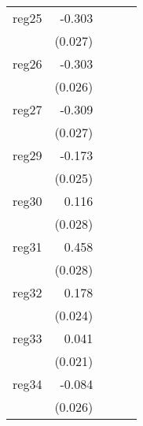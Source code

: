 {\begin{longtable}{l*{4}{D{.}{.}{-1}}}
\addlinespace
reg25       &      -0.303\sym{***}&                     &                     &                     \\
            &     (0.027)         &                     &                     &                     \\
\addlinespace
reg26       &      -0.303\sym{***}&                     &                     &                     \\
            &     (0.026)         &                     &                     &                     \\
\addlinespace
reg27       &      -0.309\sym{***}&                     &                     &                     \\
            &     (0.027)         &                     &                     &                     \\
\addlinespace
reg29       &      -0.173\sym{***}&                     &                     &                     \\
            &     (0.025)         &                     &                     &                     \\
\addlinespace
reg30       &       0.116\sym{***}&                     &                     &                     \\
            &     (0.028)         &                     &                     &                     \\
\addlinespace
reg31       &       0.458\sym{***}&                     &                     &                     \\
            &     (0.028)         &                     &                     &                     \\
\addlinespace
reg32       &       0.178\sym{***}&                     &                     &                     \\
            &     (0.024)         &                     &                     &                     \\
\addlinespace
reg33       &       0.041         &                     &                     &                     \\
            &     (0.021)         &                     &                     &                     \\
\addlinespace
reg34       &      -0.084\sym{**} &                     &                     &                     \\
            &     (0.026)         &                     &                     &                     \\

\end{longtable}}
